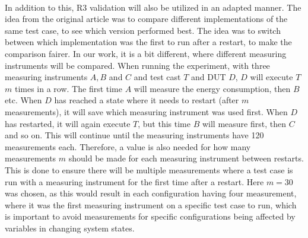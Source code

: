 \paragraph*{}
In addition to this, R3 validation\cite*[]{Bokhari2020r3} will also be utilized in an adapted manner. The idea from the original article was to compare different implementations of the same test case, to see which version performed best. The idea was to switch between which implementation was the first to run after a restart, to make the comparison fairer. In our work, it is a bit different, where different measuring instruments will be compared. When running the experiment, with three measuring instruments $A, B$ and $C$ and test cast $T$ and DUT $D$, $D$ will execute $T$ $m$ times in a row. The first time $A$ will measure the energy consumption, then $B$ etc. When $D$ has reached a state where it needs to restart (after $m$ measurements), it will save which measuring instrument was used first. When $D$ has restarted, it will again execute $T$, but this time $B$ will measure first, then $C$ and so on. This will continue until the measuring instruments have 120 measurements each. Therefore, a value is also needed for how many measurements $m$ should be made for each measuring instrument between restarts. This is done to ensure there will be multiple measurements where a test case is run with a measuring instrument for the first time after a restart. Here $m=30$ was chosen, as this would result in each configuration having four measurement, where it was the first measuring instrument on a specific test case to run, which is important to avoid measurements for specific configurations being affected by variables in changing system states.
